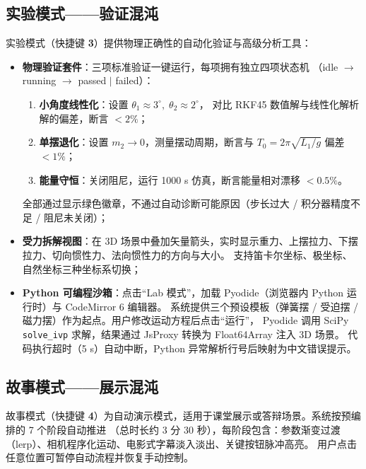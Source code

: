 \subsection{实验模式——验证混沌}

实验模式（快捷键 \textbf{3}）提供物理正确性的自动化验证与高级分析工具：

\begin{itemize}
  \item \textbf{物理验证套件}：三项标准验证一键运行，每项拥有独立四项状态机
       （idle $\to$ running $\to$ passed $|$ failed）：
       \begin{enumerate}[label=(\alph*), leftmargin=*]
         \item \textbf{小角度线性化}：设置 $\theta_1 \approx 3^\circ,\;\theta_2 \approx 2^\circ$，
              对比 RKF45 数值解与线性化解析解的偏差，断言 $< 2\%$；
         \item \textbf{单摆退化}：设置 $m_2 \to 0$，测量摆动周期，断言与 $T_0 = 2\pi\sqrt{L_1/g}$ 偏差 $< 1\%$；
         \item \textbf{能量守恒}：关闭阻尼，运行 1000 s 仿真，断言能量相对漂移 $< 0.5\%$。
       \end{enumerate}
       全部通过显示绿色徽章，不通过自动诊断可能原因（步长过大 / 积分器精度不足 / 阻尼未关闭）；
  \item \textbf{受力拆解视图}：在 3D 场景中叠加矢量箭头，实时显示重力、上摆拉力、下摆拉力、切向惯性力、法向惯性力的方向与大小。
       支持笛卡尔坐标、极坐标、自然坐标三种坐标系切换；
  \item \textbf{Python 可编程沙箱}：点击“Lab 模式”，加载 Pyodide（浏览器内 Python 运行时）与 CodeMirror 6 编辑器。
       系统提供三个预设模板（弹簧摆 / 受迫摆 / 磁力摆）作为起点。用户修改运动方程后点击“运行”，
       Pyodide 调用 SciPy \texttt{solve\_ivp} 求解，结果通过 JsProxy 转换为 Float64Array 注入 3D 场景。
       代码执行超时（5 s）自动中断，Python 异常解析行号后映射为中文错误提示。
\end{itemize}

\subsection{故事模式——展示混沌}

故事模式（快捷键 \textbf{4}）为自动演示模式，适用于课堂展示或答辩场景。系统按预编排的 7 个阶段自动推进
（总时长约 3 分 30 秒），每阶段包含：参数渐变过渡（lerp）、相机程序化运动、电影式字幕淡入淡出、关键按钮脉冲高亮。
用户点击任意位置可暂停自动流程并恢复手动控制。

